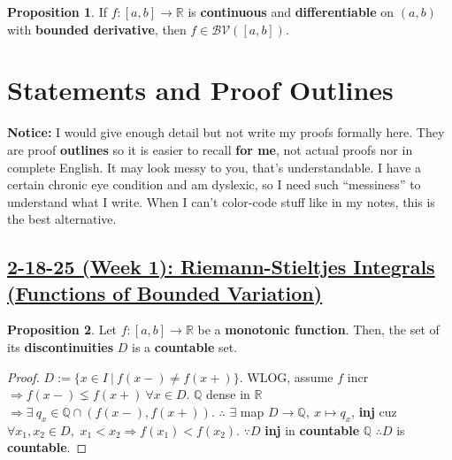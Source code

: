 \documentclass[12pt,a4paper]{article}
\theoremstyle{definition}
\newtheorem{proposition}{Proposition}
\begin{document}
\begin{proposition}
  If $f: [a, b] \rightarrow \mathbb{R}$ is \textbf{continuous} and \textbf{differentiable} on $(a, b)$ with \textbf{bounded derivative}, then \underline{$f \in \mathcal{BV}([a, b])$}.
\end{proposition}

\newpage

\section*{Statements and Proof Outlines}
\begin{mdframed}
\textbf{Notice:} I would give enough detail but not write my proofs formally here. They are proof \textbf{outlines} so it is easier to recall \textbf{for me}, not actual proofs nor in complete English. It may look messy to you, that's understandable. I have a certain chronic eye condition and am dyslexic, so I need such ``messiness'' to understand what I write. When I can't color-code stuff like in  my notes, this is the best alternative.
\end{mdframed}

\setcounter{subsection}{1}
\setcounter{theorem}{0}
\setcounter{lemma}{0}
\setcounter{proposition}{0}
\setcounter{corollary}{0}
\subsection*{\underline{\textbf{2-18-25 (Week 1): Riemann-Stieltjes Integrals (Functions of Bounded Variation)}}}
\begin{proposition}
    Let $f: [a, b] \rightarrow \mathbb{R}$ be a \textbf{monotonic function}. Then, the set of its \textbf{discontinuities} $D$ is a \textbf{countable} set.

  \begin{proof}
    $D := \{x \in I\ |\ f(x-) \neq f(x+)\}$. WLOG, assume $f$ incr $\Rightarrow f(x-) \lneq f(x+)\ \forall x \in D$.
    $\mathbb{Q}$ dense in $\mathbb{R}$ $\Rightarrow \exists\ q_x \in \mathbb{Q} \cap (f(x-), f(x+))$. 
    $\therefore$ $\exists$ map $D \rightarrow \mathbb{Q},\ x \mapsto q_x$, \textbf{inj} cuz $\forall x_1, x_2 \in D,$ \underline{$x_1 < x_2 \Rightarrow f(x_1) < f(x_2)$}. 
    $\because D$ \textbf{inj} in \textbf{countable} $\mathbb{Q}$ $\therefore D$ is \textbf{countable}.
  \end{proof}
\end{proposition}
\vspace{0.125em}
\end{document}
